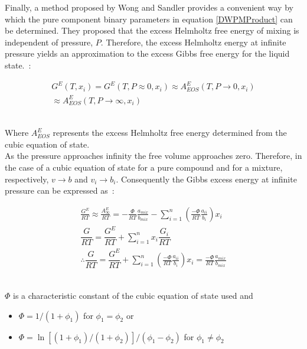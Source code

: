 Finally, a method proposed by Wong and Sandler provides a convenient way by which the pure component binary parameters in equation \ref{DWPMProduct} can be determined. They proposed that the excess Helmholtz free energy of mixing is independent of pressure, $P$. Therefore, the excess Helmholtz energy at infinite pressure yields an approximation to the excess Gibbs free energy for the liquid state.~\cite{WongSandler, WeightedPowerMeanModel}:\

\begin{eqnarray}
  G^{E}(T, x_{i}) = G^{E}(T, P \approx 0, x_{i}) \approx A_{EOS}^{E}(T, P \rightarrow 0, x_{i})\\
  \approx A_{EOS}^E(T, P \rightarrow \infty, x_{i})
\end{eqnarray}\


Where $A^{E}_{EOS}$ represents the excess Helmholtz free energy determined from the cubic equation of state.\\

As the pressure approaches infinity the free volume approaches zero. Therefore, in the case of a cubic equation of state for a pure compound and for a mixture, respectively, $ v \rightarrow b$ and $v_{i} \rightarrow b_{i}$. Consequently the Gibbs excess energy at infinite pressure can be expressed as~\cite{HuronVidal, Vidal}:\

\begin{eqnarray}
  \frac{G^{E}}{RT} \approx \frac{A^{E}_{\infty}}{RT} = -\frac{\Phi}{RT} \frac{a_{mix}}{b_{mix}} -\sum_{i = 1}^{n}\left(\frac{-\Phi}{RT} \frac{a_{ii}}{b_{i}}\right)x_{i} \label{DWPMPureParamsDeriv}\\
  \dfrac{G}{RT} = \dfrac{G^{E}}{RT} + \sum_{i=1}^{n}x_{i}\dfrac{G_{i}}{RT}\\
   \therefore \dfrac{G}{RT} = \dfrac{G^{E}}{RT} +\sum_{i=1}^{n}\left(\frac{-\Phi}{RT} \frac{a_{ii}}{b_{i}}\right)x_{i} = \frac{-\Phi}{RT} \frac{a_{mix}}{b_{mix}} 
\end{eqnarray}\


$\Phi$ is a characteristic constant of the cubic equation of state used and\\

\begin{itemize}
\item $\Phi = 1/\left(1+\phi_{1}\right)$ for $\phi_{1} = \phi_{2}$ or
\item $\Phi = \ln \left[\left(1+\phi_{1}\right)/\left(1+\phi_{2}\right)\right]/\left(\phi_{1} - \phi_{2}\right)$ for  $\phi_{1} \neq \phi_{2}$
\end{itemize}\

